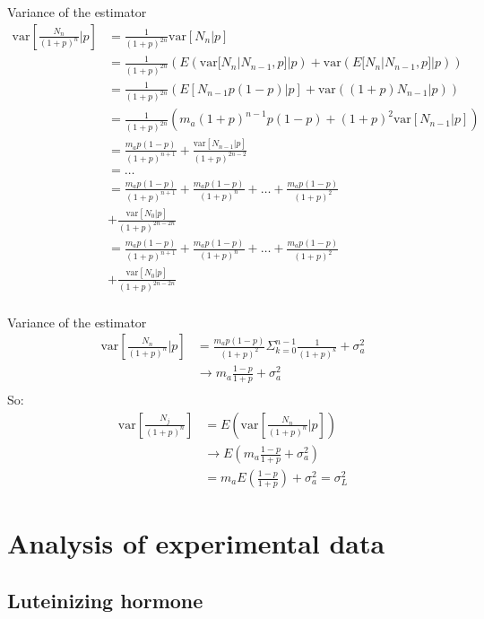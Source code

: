 \documentclass{beamer}
\begin{document}
\begin{frame}{Variance of the estimator}
\begin{align*}
\text{var}[\frac{N_n}{(1+p)^n}|p] &= \frac{1}{(1+p)^{2n}}\text{var}[N_n|p] \\
&= \frac{1}{(1+p)^{2n}} ( E(\text{var}[N_n|N_{n-1},p]|p) + \text{var}(E[N_n|N_{n-1},p]|p) ) \\
&= \frac{1}{(1+p)^{2n}} ( E[N_{n-1}p(1-p)|p] + \text{var}((1+p)N_{n-1}|p) ) \\
&= \frac{1}{(1+p)^{2n}} ( m_a (1+p)^{n-1}p(1-p) + (1+p)^2\text{var}[N_{n-1}|p] ) \\
&= \frac{m_a p (1-p)}{(1+p)^{n+1}}  + \frac{\text{var}[N_{n-1}|p]}{(1+p)^{2n-2}} \\
&= \dots \\
&= \frac{m_a p (1-p)}{(1+p)^{n+1}}  + \frac{m_a p (1-p)}{(1+p)^{n}} + \dots + \frac{m_a p (1-p)}{(1+p)^{2}} \\ &+ \frac{\text{var}[N_{0}|p]}{(1+p)^{2n-2n}} \\
&= \frac{m_a p (1-p)}{(1+p)^{n+1}}  + \frac{m_a p (1-p)}{(1+p)^{n}} + \dots + \frac{m_a p (1-p)}{(1+p)^{2}} \\ 
& + \frac{\text{var}[N_{0}|p]}{(1+p)^{2n-2n}} \\
\end{align*}
\end{frame}


\begin{frame}{Variance of the estimator}
\begin{align*}
\text{var}[\frac{N_n}{(1+p)^n}|p] &= \frac{m_a p (1-p)}{(1+p)^{2}} \Sigma_{k=0}^{n-1}\frac{1}{(1+p)^k} + \sigma^2_a \\ 
&\to m_a  \frac{1-p}{1+p} + \sigma^2_a \\
\end{align*}
So:
\begin{align*}
\text{var}[\frac{N_j}{(1+p)^n}] &= E(\text{var}[\frac{N_n}{(1+p)^n}|p])\\
&\to E(m_a \frac{1-p}{1+p} + \sigma^2_a) \\
&= m_a E(\frac{1-p}{1+p}) + \sigma^2_a = \sigma^2_L
\end{align*}
\end{frame}


\section{Analysis of experimental data}
\subsection{Luteinizing hormone}
\end{document}
